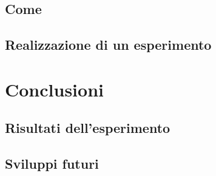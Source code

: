 \documentclass [10pt, a4paper, onecolumn, oneside] {scrreprt}
\numberwithin{endnote}{chapter}
\renewcommand{\lstlistlistingname}{Elenco dei codici}}
\begin{document}
	\section{Come} \label{sez:come}
		 \vfill
	\section{Realizzazione di un esperimento} \label{sez:esperimento}
		 \vfill



\chapter{Conclusioni} \label{cap:conclusioni}
		 \vfill\eject
	\section{Risultati dell'esperimento} \label{sez:risultati}
		 \vfill
	\section{Sviluppi futuri} \label{sez:sviluppi}
		 \vfill







\eject
\newpage
\thispagestyle{empty}
\mbox{}

\appendix{}
%

\eject
\newpage
\thispagestyle{empty}
\mbox{}

\listoffigures
\begingroup
\let \clearpage \relax
{}
\vfill \listoftables
\vfill \lstlistoflistings
\endgroup
\eject
\newpage
\thispagestyle{empty}
\mbox{}

%


\vfill\eject


\end{document}
